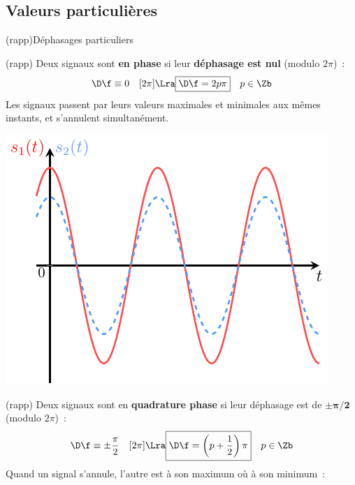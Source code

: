 \documentclass[../../main/main.tex]{subfiles}
\begin{document}
\subsection{Valeurs particulières}
\begin{tcb}[breakable](rapp){Déphasages particuliers}
	\vspace{-10pt}
	\begin{isd}[righthand ratio=.3, interior hidden](rapp)
		Deux signaux sont \textbf{en phase} si leur \textbf{déphasage est nul}
		(modulo $2\pi$)~:
		\[
			\D\f \equiv 0\quad[2\pi]
			\Lra
			\boxed{\D\f = 2p\pi}
			\quad p \in \Zb
		\]
		Les signaux passent par leurs valeurs maximales et minimales aux mêmes
		instants, et s'annulent simultanément.
		\tcblower
		\begin{center}
			\includegraphics[width=\linewidth]{dfeq0.pdf}
			\captionsetup{justification=centering}
		\end{center}
	\end{isd}
	\vspace{-15pt}
	\begin{isd}[righthand ratio=.3, interior hidden](rapp)
		Deux signaux sont en \textbf{quadrature phase} si leur déphasage est de
		$\mathbf{\pm\pi/2}$ (modulo $2\pi$)~:
		\[
			\D\f \equiv \pm\frac{\pi}{2} \quad[2\pi]
			\Lra
			\boxed{\D\f = \left( p+\frac{1}{2} \right)\pi}
			\quad p \in \Zb
		\]
		Quand un signal s'annule, l'autre est à son maximum où à son minimum~:

\end{isd}
\end{tcb}
\end{document}
